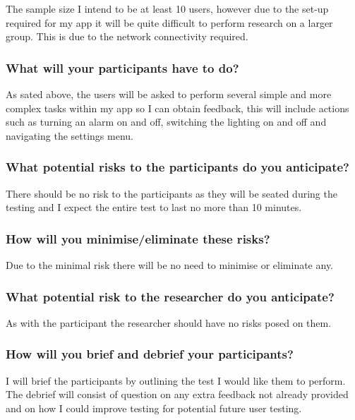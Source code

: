 The sample size I intend to be at least 10 users, however due to the
set-up required for my app it will be quite difficult to perform
research on a larger group. This is due to the network connectivity
required.

\subsubsection{What will your participants have to
do?}\label{what-will-your-participants-have-to-do}

As sated above, the users will be asked to perform several simple and
more complex tasks within my app so I can obtain feedback, this will
include actions such as turning an alarm on and off, switching the
lighting on and off and navigating the settings menu.

\subsubsection{What potential risks to the participants do you
anticipate?}\label{what-potential-risks-to-the-participants-do-you-anticipate}

There should be no risk to the participants as they will be seated
during the testing and I expect the entire test to last no more than 10
minutes.

\subsubsection{How will you minimise/eliminate these
risks?}\label{how-will-you-minimiseeliminate-these-risks}

Due to the minimal risk there will be no need to minimise or eliminate
any.

\subsubsection{What potential risk to the researcher do you
anticipate?}\label{what-potential-risk-to-the-researcher-do-you-anticipate}

As with the participant the researcher should have no risks posed on
them.

\subsubsection{How will you brief and debrief your
participants?}\label{how-will-you-brief-and-debrief-your-participants}

I will brief the participants by outlining the test I would like them to
perform. The debrief will consist of question on any extra feedback not
already provided and on how I could improve testing for potential future
user testing.

